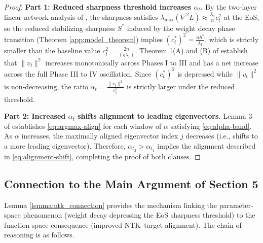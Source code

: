 \documentclass{article}
\begin{document}
\begin{proof}
\textbf{Part 1: Reduced sharpness threshold increases $\alpha_t$.}
By the two-layer linear network analysis of \citep{ntk_eos}, the sharpness satisfies $\lambda_{\max}(\nabla^2L) \approx \frac{\lambda_1}{n}c_t^2$ at the EoS, so the reduced stabilizing sharpness $S^*$ induced by the weight decay phase transition (Theorem \ref{app:model_theorem}) implies $\left(c^*_t\right)^{2} = \frac{nS^*}{\lambda_1}$, which is strictly smaller than the baseline value $c^2_t = \frac{2n}{(\eta\lambda_1)}$. Theorem 1(A) and (B) of \citep{ntk_eos} establish that $\|v_t\|^2$ increases monotonically across Phases I to III and has a net increase across the full Phase III to IV oscillation. Since $\left(c^*_t\right)^{2}$ is depressed while $\|v_t\|^2$ is non-decreasing, the ratio $\alpha_t = \frac{\|v_t\|^2}{c_t^2}$ is strictly larger under the reduced threshold. \medskip

\textbf{Part 2: Increased $\alpha_t$ shifts alignment to leading eigenvectors.} Lemma 3 of \citep{ntk_eos} establishes \eqref{eq:argmax-align} for each window of $\alpha$ satisfying \eqref{eq:alpha-band}. As $\alpha$ increases, the maximally aligned eigenvector index $j$ decreases (i.e., shifts to a more leading eigenvector). Therefore, $\alpha_{t_2} > \alpha_{t_1}$ implies the alignment described in \eqref{eq:alignment-shift}, completing the proof of both clauses.
\end{proof}

\subsection{Connection to the Main Argument of Section 5}

Lemma \ref{lemma:ntk_connection} provides the mechanism linking the parameter-space phenomenon (weight decay depressing
the EoS sharpness threshold) to the function-space consequence (improved NTK--target alignment).
The chain of reasoning is as follows.
\end{document}
